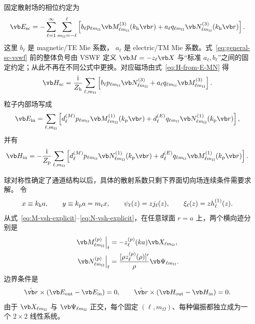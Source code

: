 固定散射场的相位约定为
\begin{equation}
{
\vb E_{\rm sc}
=-\sum_{\ell=1}^{\infty}
\sum_{m_{\Omega}=-\ell}^{\ell}
\left[
 b_\ell p_{\ell m_{\Omega}}\vb M_{\ell m_{\Omega}}^{(3)}(k_{\rm h}\vb r)
+a_\ell q_{\ell m_{\Omega}}\vb N_{\ell m_{\Omega}}^{(3)}(k_{\rm h}\vb r)
\right].}
\label{eq:general-sc-vswf}
\end{equation}
这里
$b_\ell$ 是 magnetic/TE Mie 系数，
$a_\ell$ 是 electric/TM Mie 系数。式~\cref{eq:general-sc-vswf} 前的整体负号由 VSWF 定义
$\vb M=-z_\ell\vb X$ 与“标准 $a_\ell,b_\ell$”之间的固定约定；从此不再在不同公式中更换。对应磁场由式~\cref{eq:H-from-E-MN} 得
\begin{equation}
\vb H_{\rm sc}
=\frac{\ii}{Z_{\rm h}}
\sum_{\ell,m_{\Omega}}
\left[
 b_\ell p_{\ell m_{\Omega}}\vb N_{\ell m_{\Omega}}^{(3)}
+a_\ell q_{\ell m_{\Omega}}\vb M_{\ell m_{\Omega}}^{(3)}
\right].
\label{eq:general-sc-vswf-H}
\end{equation}
粒子内部场写成
\begin{equation}
\vb E_{\rm in}
=\sum_{\ell,m_{\Omega}}
\left[
 d_\ell^{(M)}p_{\ell m_{\Omega}}\vb M_{\ell m_{\Omega}}^{(1)}(k_{\rm p}\vb r)
+d_\ell^{(E)}q_{\ell m_{\Omega}}\vb N_{\ell m_{\Omega}}^{(1)}(k_{\rm p}\vb r)
\right],
\label{eq:general-int-vswf}
\end{equation}
并有
\begin{equation}
\vb H_{\rm in}
=-\frac{\ii}{Z_{\rm p}}
\sum_{\ell,m_{\Omega}}
\left[
 d_\ell^{(M)}p_{\ell m_{\Omega}}\vb N_{\ell m_{\Omega}}^{(1)}(k_{\rm p}\vb r)
+d_\ell^{(E)}q_{\ell m_{\Omega}}\vb M_{\ell m_{\Omega}}^{(1)}(k_{\rm p}\vb r)
\right].
\end{equation}

球对称性确定了通道结构以后，具体的散射系数只剩下界面切向场连续条件需要求解。
令
\begin{equation}
x\equiv k_{\rm h}a,
\qquad
y\equiv k_{\rm p}a=m_{\rm r}x,
\qquad
\psi_\ell(z)=zj_\ell(z),
\qquad
\xi_\ell(z)=zh_\ell^{(1)}(z).
\label{eq:riccati-bessel}
\end{equation}
从式~\cref{eq:M-vsh-explicit}--\cref{eq:N-vsh-explicit}，在任意球面 $r=a$ 上，两个横向迹分别是
\begin{align}
\left.\vb M_{\ell m_{\Omega}}^{(p)}\right|_{t}
&=-z_\ell^{(p)}(ka)\vb X_{\ell m_{\Omega}},
\\
\left.\vb N_{\ell m_{\Omega}}^{(p)}\right|_{t}
&=\frac{[\rho z_\ell^{(p)}(\rho)]'}{\rho}
\vb\Psi_{\ell m_{\Omega}}.
\label{eq:MN-tangential-traces}
\end{align}
边界条件是
\begin{equation}
\hat{\vb r}\times
(\vb E_{\rm out}-\vb E_{\rm in})=0,
\qquad
\hat{\vb r}\times
(\vb H_{\rm out}-\vb H_{\rm in})=0.
\label{eq:maxwell-tangential-bc}
\end{equation}
由于 $\vb X_{\ell m_{\Omega}}$ 与 $\vb\Psi_{\ell m_{\Omega}}$ 正交，每个固定
$(\ell,m_{\Omega})$、每种偏振都独立成为一个 $2\times2$ 线性系统。

